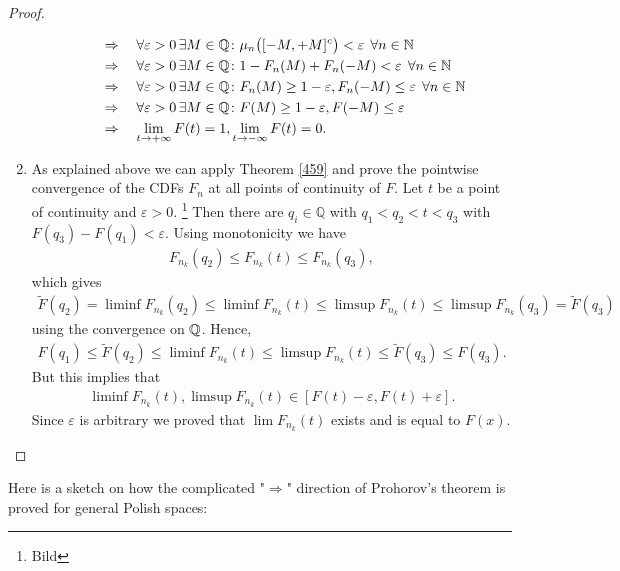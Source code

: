 \begin{proof}[Proof]
\begin{enumerate}[label=(\roman*)]
\begin{itemize}
\begin{align*}
						&\Rightarrow\quad \forall \varepsilon > 0 \,\exists M\in \mathbb{Q}\colon \mu_n \big( [ -M,+M]^c \big) < \varepsilon \:\: \forall n\in\mathbb{N}\\
									&\Rightarrow\quad \forall \varepsilon > 0\, \exists M\in \mathbb{Q}\colon 1-F_n(M)+F_n(-M) < \varepsilon \:\: \forall n \in \mathbb{N} \\
												&\Rightarrow\quad \forall \varepsilon > 0 \,\exists M\in\mathbb{Q} \colon F_n(M) \geq 1- \varepsilon, F_n(-M)\leq \varepsilon \:\: \forall n \in \mathbb{N} \\
												&\Rightarrow\quad \forall \varepsilon > 0 \,\exists M\in \mathbb{Q}\colon F(M) \geq 1- \varepsilon, F(-M)\leq \varepsilon \\
												&\Rightarrow\quad \lim_{t\to+\infty} F(t) = 1, \lim_{t\to-\infty}F(t)=0.
					\end{align*}
			\end{itemize}
		\item As explained above we can apply Theorem \ref{459} and prove the pointwise convergence of the CDFs $F_n$ at all points of continuity of $F$. Let $t$ be a point of continuity and $\varepsilon>0$. \footnote{Bild}
			Then there are $q_i \in \mathbb{Q}$ with $q_1 < q_2 < t < q_3$ with $F(q_3) - F(q_1) < \varepsilon$. Using monotonicity we have
			\begin{align*}
				F_{n_k}(q_2) \leq F_{n_k}(t) \leq F_{n_k}(q_3),
			\end{align*}
			which gives
			\begin{align*}
				\tilde F(q_2)=\liminf F_{n_k}(q_2) \leq \liminf F_{n_k}(t) \leq \limsup F_{n_k}(t) \leq \limsup F_{n_k}(q_3)=\tilde F(q_3)
			\end{align*}
			using the convergence on $\mathbb{Q}$. Hence,
			\begin{align*}
				F(q_1) \leq \tilde{F}(q_2) \leq \liminf F_{n_k}(t) \leq \limsup F_{n_k}(t) \leq \tilde{F}(q_3) \leq F(q_3).
			\end{align*}
			But this implies that 
			\begin{align*}
				 \liminf F_{n_k}(t),  \limsup F_{n_k}(t)\in [F(t)-\varepsilon, F(t)+\varepsilon].
			\end{align*}
			Since $\varepsilon$ is arbitrary we proved that $\lim F_{n_k}(t)$ exists and is equal to $F(x)$. 
	\end{enumerate}
\end{proof}
Here is a sketch on how the complicated "{}$\Rightarrow$"{} direction of Prohorov's theorem is proved for general Polish spaces:
